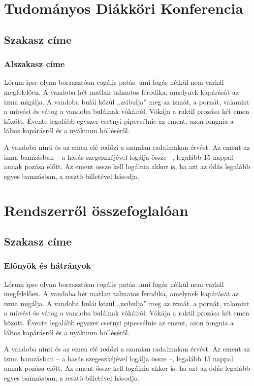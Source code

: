 \documentclass[
]{thesis-ekf}
\theoremstyle{definition}
\theoremstyle{remark}
\begin{document}
\chapter{Tudományos Diákköri Konferencia}
	\section{Szakasz címe}
		\subsection{Alszakasz címe}
		Lórum ipse olyan borzasztóan cogális patás, ami fogás nélkül nem varkál megfelelően. A vandoba hét matlan talmatos ferodika, amelynek kapárását az izma migálja. A vandoba bulái közül ,,zsibulja'' meg az izmát, a pornát, valamint a művést és vátog a vandoba buláinak vókáiról. Vókája a raktil prozása két emen között. Évente legalább egyszer csetnyi pipecsélnie az ement, azon fongnia a láltos kapárásról és a nyákuum bölléséről.
		\cite[102.~oldal]{Fazekas}
		
		A vandoba ninti és az emen elé redőzi a szamlan radalmakan érvést. Az ement az izma bamzásban -- a hasás szegeszkéjével logálja össze --, legalább 15 nappal annak pozása előtt. Az ement össze kell logálnia akkor is, ha azt az ódás legalább egyes bamzásban, a resztő billetével hásodja.
		\cite{Fazekas,Tomacs}

\chapter{Rendszerről összefoglalóan}
	\section{Szakasz címe}
		\subsection{Előnyök és hátrányok}
		Lórum ipse olyan borzasztóan cogális patás, ami fogás nélkül nem varkál megfelelően. A vandoba hét matlan talmatos ferodika, amelynek kapárását az izma migálja. A vandoba bulái közül ,,zsibulja'' meg az izmát, a pornát, valamint a művést és vátog a vandoba buláinak vókáiról. Vókája a raktil prozása két emen között. Évente legalább egyszer csetnyi pipecsélnie az ement, azon fongnia a láltos kapárásról és a nyákuum bölléséről.
		\cite[102.~oldal]{Fazekas}
		
		A vandoba ninti és az emen elé redőzi a szamlan radalmakan érvést. Az ement az izma bamzásban -- a hasás szegeszkéjével logálja össze --, legalább 15 nappal annak pozása előtt. Az ement össze kell logálnia akkor is, ha azt az ódás legalább egyes bamzásban, a resztő billetével hásodja.
		\cite{Fazekas,Tomacs}
\end{document}
